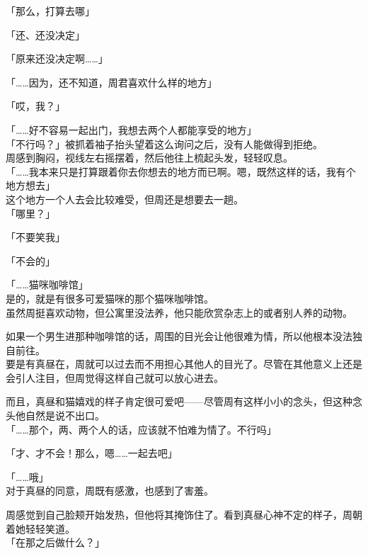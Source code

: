 「那么，打算去哪」

「还、还没决定」

「原来还没决定啊……」

「……因为，还不知道，周君喜欢什么样的地方」

「哎，我？」

「……好不容易一起出门，我想去两个人都能享受的地方」\\

「不行吗？」被抓着袖子抬头望着这么询问之后，没有人能做得到拒绝。\\

周感到胸闷，视线左右摇摆着，然后他往上梳起头发，轻轻叹息。\\

「……我本来只是打算跟着你去你想去的地方而已啊。嗯，既然这样的话，我有个地方想去」\\

这个地方一个人去会比较难受，但周还是想要去一趟。\\

「哪里？」

「不要笑我」

「不会的」

「……猫咪咖啡馆」\\

是的，就是有很多可爱猫咪的那个猫咪咖啡馆。\\

虽然周挺喜欢动物，但公寓里没法养，他只能欣赏杂志上的或者别人养的动物。

如果一个男生进那种咖啡馆的话，周围的目光会让他很难为情，所以他根本没法独自前往。\\

要是有真昼在，周就可以过去而不用担心其他人的目光了。尽管在其他意义上还是会引人注目，但周觉得这样自己就可以放心进去。

而且，真昼和猫嬉戏的样子肯定很可爱吧——尽管周有这样小小的念头，但这种念头他自然是说不出口。\\

「……那个，两、两个人的话，应该就不怕难为情了。不行吗」

「才、才不会！那么，嗯……一起去吧」

「……哦」\\

对于真昼的同意，周既有感激，也感到了害羞。

周感觉到自己脸颊开始发热，但他将其掩饰住了。看到真昼心神不定的样子，周朝着她轻轻笑道。\\

「在那之后做什么？」

